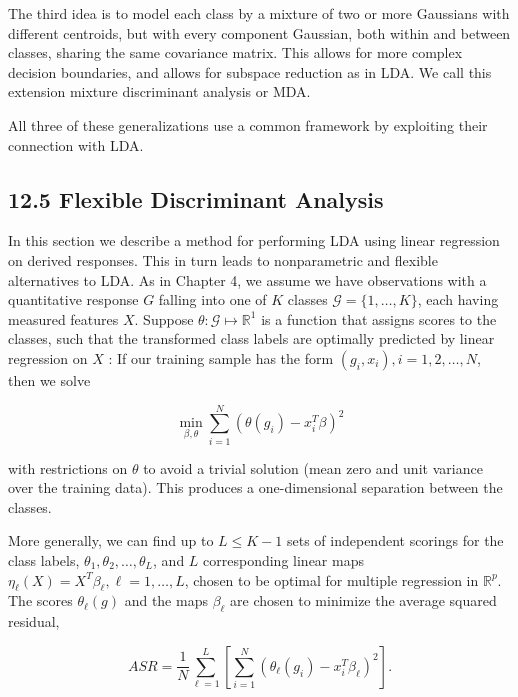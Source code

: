 \documentclass[10pt]{article}
\begin{document}
The third idea is to model each class by a mixture of two or more Gaussians with different centroids, but with every component Gaussian, both within and between classes, sharing the same covariance matrix. This allows for more complex decision boundaries, and allows for subspace reduction as in LDA. We call this extension mixture discriminant analysis or MDA.

All three of these generalizations use a common framework by exploiting their connection with LDA.

\subsection*{12.5 Flexible Discriminant Analysis}
In this section we describe a method for performing LDA using linear regression on derived responses. This in turn leads to nonparametric and flexible alternatives to LDA. As in Chapter 4, we assume we have observations with a quantitative response $G$ falling into one of $K$ classes $\mathcal{G}=\{1, \ldots, K\}$, each having measured features $X$. Suppose $\theta: \mathcal{G} \mapsto \mathbb{R}^{1}$ is a function that assigns scores to the classes, such that the transformed class labels are optimally predicted by linear regression on $X$ : If our training sample has the form $\left(g_{i}, x_{i}\right), i=1,2, \ldots, N$, then we solve


\begin{equation*}
\min _{\beta, \theta} \sum_{i=1}^{N}\left(\theta\left(g_{i}\right)-x_{i}^{T} \beta\right)^{2} \tag{12.52}
\end{equation*}


with restrictions on $\theta$ to avoid a trivial solution (mean zero and unit variance over the training data). This produces a one-dimensional separation between the classes.

More generally, we can find up to $L \leq K-1$ sets of independent scorings for the class labels, $\theta_{1}, \theta_{2}, \ldots, \theta_{L}$, and $L$ corresponding linear maps $\eta_{\ell}(X)= X^{T} \beta_{\ell}, \ell=1, \ldots, L$, chosen to be optimal for multiple regression in $\mathbb{R}^{p}$. The scores $\theta_{\ell}(g)$ and the maps $\beta_{\ell}$ are chosen to minimize the average squared residual,


\begin{equation*}
A S R=\frac{1}{N} \sum_{\ell=1}^{L}\left[\sum_{i=1}^{N}\left(\theta_{\ell}\left(g_{i}\right)-x_{i}^{T} \beta_{\ell}\right)^{2}\right] . \tag{12.53}
\end{equation*}
\end{document}
